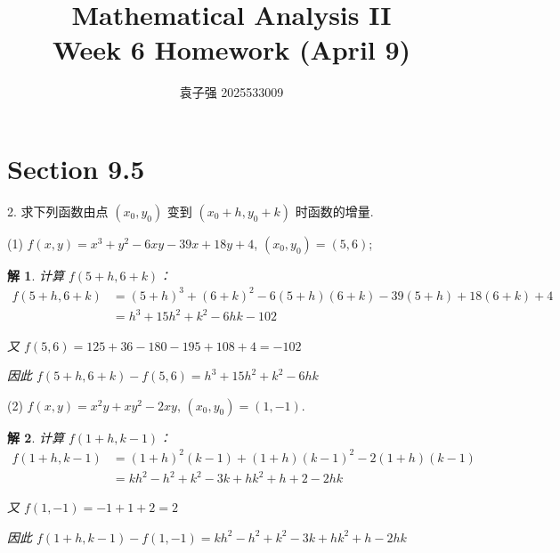 \documentclass[a4paper,12pt]{article}
\title{Mathematical Analysis II\\Week 6 Homework (April 9)}
\author{袁子强\hspace{1cm} 2025533009}
\newtheorem*{sol}{解}
\begin{document}
\maketitle

\section*{Section 9.5}

2. 求下列函数由点 $(x_0,y_0)$ 变到 $(x_0+h,y_0+k)$ 时函数的增量.

(1) $f(x,y) = x^3 + y^2 - 6xy - 39x + 18y + 4$, $(x_0,y_0) = (5,6)$;
\begin{sol}
    计算 $f(5+h,6+k)$：
    \begin{align*}
        f(5+h,6+k) & =(5+h)^3+(6+k)^2-6(5+h)(6+k)-39(5+h)+18(6+k)+4 \\
                   & =h^3+15h^2+k^2-6hk-102
    \end{align*}

    又 $f(5,6)=125+36-180-195+108+4=-102$

    因此 $f(5+h,6+k)-f(5,6)=h^3+15h^2+k^2-6hk$
\end{sol}

(2) $f(x,y) = x^2y + xy^2 - 2xy$, $(x_0,y_0) = (1,-1)$.
\begin{sol}
    计算 $f(1+h,k-1)$：
    \begin{align*}
        f(1+h,k-1) & =(1+h)^2(k-1)+(1+h)(k-1)^2-2(1+h)(k-1) \\
                   & =kh^2-h^2+k^2-3k+hk^2+h+2-2hk
    \end{align*}

    又 $f(1,-1)=-1+1+2=2$

    因此 $f(1+h,k-1)-f(1,-1)=kh^2-h^2+k^2-3k+hk^2+h-2hk$
\end{sol}
\end{document}

